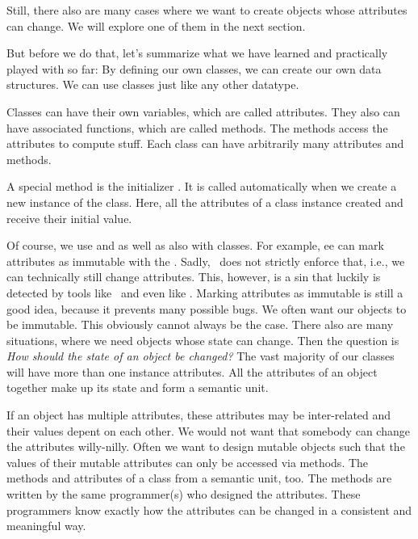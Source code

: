 Still, there also are many cases where we want to create objects whose attributes can change.
We will explore one of them in the next section.

But before we do that, let's summarize what we have learned and practically played with so far:
By defining our own classes, we can create our own data structures.
We can use classes just like any other datatype.

Classes can have their own variables, which are called attributes.
They also can have associated functions, which are called methods.
The methods access the attributes to compute stuff.
Each class can have arbitrarily many attributes and methods.

A special method is the initializer .
It is called automatically when we create a new instance of the class.
Here, all the attributes of a class instance created and receive their initial value.

Of course, we use  and  as well as  also with classes.
For example, ee can mark attributes as immutable with the  .
Sadly, \python\ does not strictly enforce that, i.e., we can technically still change  attributes.
This, however, is a sin that luckily is detected by tools like \mypy\ and even  like \pycharm.
Marking attributes as immutable is still a good idea, because it prevents many possible bugs.%
\FloatBarrier%
\endhsection%
%
%
\FloatBarrier%
%
%
%
%
We often want our objects to be immutable.
This obviously cannot always be the case.
There also are many situations, where we need objects whose state can change.
Then the question is \emph{How should the state of an object be changed?}
The vast majority of our classes will have more than one instance attributes.
All the attributes of an object together make up its state and form a semantic unit.

If an object has multiple attributes, these attributes may be inter-related and their values depent on each other.
We would not want that somebody can change the attributes willy-nilly.
Often we want to design mutable objects such that the values of their mutable attributes can only be accessed via methods.
The methods and attributes of a class from a semantic unit, too.
The methods are written by the same programmer(s) who designed the attributes.
These programmers know exactly how the attributes can be changed in a consistent and meaningful way.

